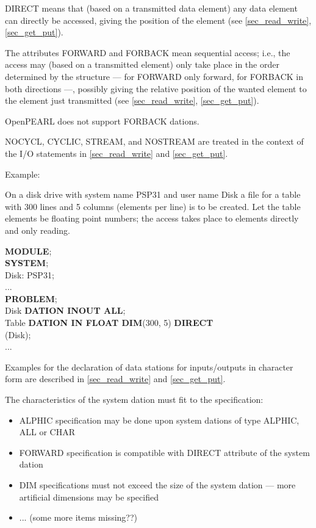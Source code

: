 DIRECT means that (based on a transmitted data element) any data element
can directly be accessed, giving the position of the element
(see \ref{sec_read_write}, \ref{sec_get_put}).

The attributes FORWARD and FORBACK mean sequential access; i.e., the
access may (based on a transmitted element) only take place in the order
determined by the structure --- for FORWARD only forward, for FORBACK in
both directions ---, possibly giving the relative position of the wanted
element to the element just transmitted 
(see \ref{sec_read_write}, \ref{sec_get_put}).

\begin{added}
OpenPEARL does not support FORBACK dations.
\end{added}

NOCYCL, CYCLIC, STREAM, and NOSTREAM are treated in the context of the
I/O statements in 
\ref{sec_read_write} and \ref{sec_get_put}.

Example:

On a disk drive with system name PSP31 and user name Disk a file for a
table with 300 lines and 5 columns (elements per line) is to be created.
Let the table elements be floating point numbers; the access takes place
to elements directly and only reading.

{\bf MODULE};\\

{\bf SYSTEM};\\
\x Disk: PSP31;\\
\x ... \\
\label{Example}
{\bf PROBLEM};\\
 Disk {\bf DATION INOUT  ALL};\\
 Table {\bf DATION IN FLOAT DIM}(300, 5) {\bf DIRECT}\\
\x {} (Disk);\\
\x ...

Examples for the declaration of data stations for inputs/outputs in
character form are described in 
\ref{sec_read_write} and \ref{sec_get_put}.

\begin{added}
The characteristics of the system dation must fit to the specification:
\begin{itemize}
\item ALPHIC specification may be done upon system dations of type ALPHIC,
   ALL or CHAR
\item FORWARD specification is compatible with DIRECT attribute
   of the system dation
\item DIM specifications must not exceed the size of the system dation --- 
   more artificial dimensions may be specified
\item ... (some more items missing??)
\end{itemize}
\end{added}

